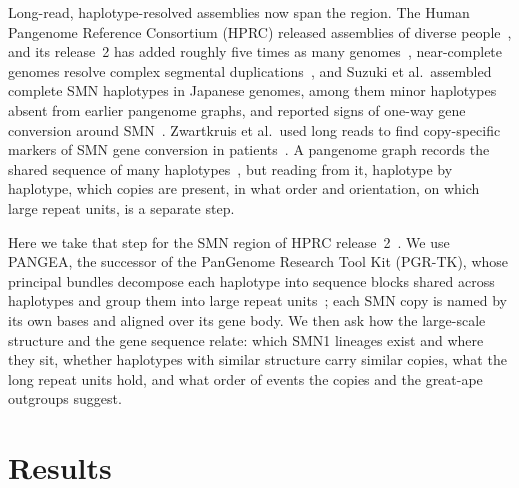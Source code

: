 \documentclass[10pt]{article}
\begin{document}
Long-read, haplotype-resolved assemblies now span the region. The Human Pangenome Reference Consortium (HPRC) released
assemblies of diverse people~\cite{liao2023}, and its release~2 has added roughly five times as many genomes~\cite{lucas2026}, near-complete genomes resolve complex segmental
duplications~\cite{logsdon2025}, and Suzuki et al.\ assembled complete SMN haplotypes in Japanese genomes, among them
minor haplotypes absent from earlier pangenome graphs, and reported signs of one-way gene conversion around
SMN~\cite{suzuki2026}. Zwartkruis et al.\ used long reads to find copy-specific markers of SMN gene conversion in
patients~\cite{zwartkruis2025}. A pangenome graph records the shared sequence of many haplotypes~\cite{hickey2024},
but reading from it, haplotype by haplotype, which copies are present, in what order and orientation, on which large
repeat units, is a separate step.

Here we take that step for the SMN region of HPRC release~2~\cite{lucas2026}. We use PANGEA, the successor of the PanGenome Research Tool Kit (PGR-TK), whose principal
bundles decompose each haplotype into sequence blocks shared across haplotypes and group them into large repeat
units~\cite{chin2023}; each SMN copy is named by its own bases and aligned over its gene body. We then ask how the
large-scale structure and the gene sequence relate: which SMN1 lineages exist and where they sit, whether haplotypes
with similar structure carry similar copies, what the long repeat units hold, and what order of events the copies and
the great-ape outgroups suggest.

\section{Results}\label{m:results}
\end{document}
